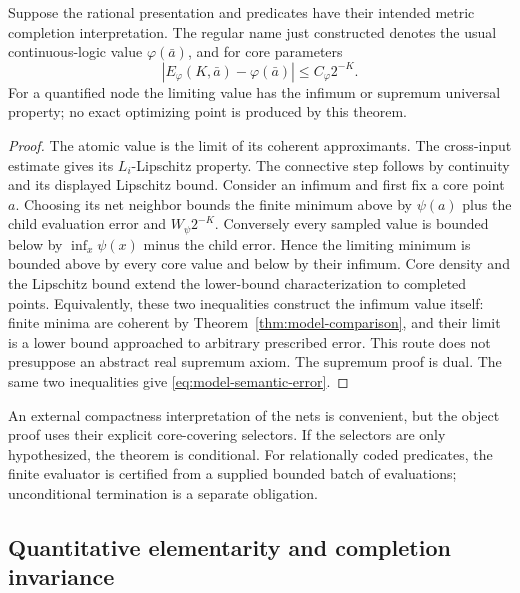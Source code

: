 \begin{theorem}
\label{thm:model-adequacy}
Suppose the rational presentation and predicates have their intended metric
completion interpretation. The regular name just constructed denotes the
usual continuous-logic value $\varphi(\bar a)$, and for core parameters
\begin{equation}
 |E_\varphi(K,\bar a)-\varphi(\bar a)|
 \leq C_\varphi2^{-K}.
 \label{eq:model-semantic-error}
\end{equation}
For a quantified node the limiting value has the infimum or supremum
universal property; no exact optimizing point is produced by this theorem.
\end{theorem}

\begin{proof}
The atomic value is the limit of its coherent approximants. The cross-input
estimate gives its $L_i$-Lipschitz property. The connective step follows by
continuity and its displayed Lipschitz bound. Consider an infimum and first
fix a core point $a$. Choosing its net neighbor bounds the finite minimum
above by $\psi(a)$ plus the child evaluation error and
$W_\psi2^{-K}$. Conversely every sampled value is bounded below by
$\inf_x\psi(x)$ minus the child error. Hence the limiting minimum is bounded
above by every core value and below by their infimum. Core density and the
Lipschitz bound extend the lower-bound characterization to completed points.
Equivalently, these two inequalities construct the infimum value itself:
finite minima are coherent by Theorem~\ref{thm:model-comparison}, and their
limit is a lower bound approached to arbitrary prescribed error. This route
does not presuppose an abstract real supremum axiom. The supremum proof is
dual. The same two inequalities give \eqref{eq:model-semantic-error}.
\end{proof}

An external compactness interpretation of the nets is convenient, but the
object proof uses their explicit core-covering selectors. If the selectors
are only hypothesized, the theorem is conditional. For relationally coded
predicates, the finite evaluator is certified from a supplied bounded batch
of evaluations; unconditional termination is a separate obligation.

\subsection{Quantitative elementarity and completion invariance}

